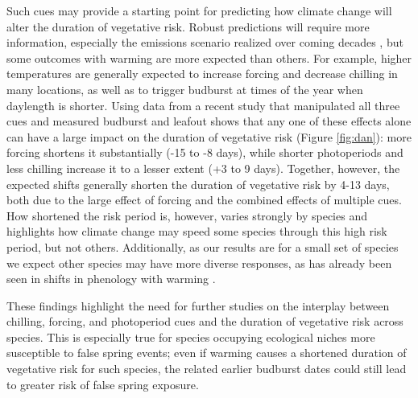 \documentclass{article}\usepackage[]{graphicx}\usepackage[]{color}
\begin{document}
Such cues may provide a starting point for predicting how climate change will alter the duration of vegetative risk. Robust predictions will require more information, especially the emissions scenario realized over coming decades \citep{IPCC2014}, but some outcomes with warming are more expected than others. For example, higher temperatures are generally expected to increase forcing and decrease chilling in many locations, as well as to trigger budburst at times of the year when daylength is shorter. Using data from a recent study that manipulated all three cues and measured budburst and leafout \citep{Flynn2018} shows that any one of these effects alone can have a large impact on the duration of vegetative risk (Figure \ref{fig:dan}): more forcing shortens it substantially (-15 to -8 days), while shorter photoperiods and less chilling increase it to a lesser extent (+3 to 9 days). Together, however, the expected shifts generally shorten the duration of vegetative risk by 4-13 days, both due to the large effect of forcing and the combined effects of multiple cues. How shortened the risk period is, however, varies strongly by species and highlights how climate change may speed some species through this high risk period, but not others. Additionally, as our results are for a small set of species we expect other species may have more diverse responses, as has already been seen in shifts in phenology with warming \citep{Cleland2006, Fu2015, Xin2016}.

These findings highlight the need for further studies on the interplay between chilling, forcing, and photoperiod cues and the duration of vegetative risk across species. This is especially true for species occupying ecological niches more susceptible to false spring events; even if warming causes a shortened duration of vegetative risk for such species, the related earlier budburst dates could still lead to greater risk of false spring exposure.

\end{document}
